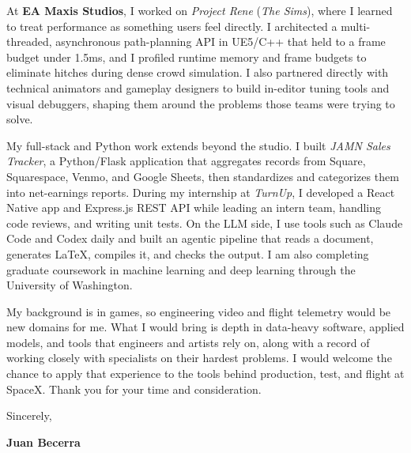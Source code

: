 \documentclass[letterpaper,11pt]{article}
\begin{document}
At \textbf{EA Maxis Studios}, I worked on \emph{Project Rene} (\emph{The Sims}), where I learned to treat
performance as something users feel directly. I architected a multi-threaded, asynchronous path-planning
API in UE5/C++ that held to a frame budget under 1.5ms, and I profiled runtime memory and frame budgets to
eliminate hitches during dense crowd simulation. I also partnered directly with technical animators and
gameplay designers to build in-editor tuning tools and visual debuggers, shaping them around the problems
those teams were trying to solve.

My full-stack and Python work extends beyond the studio. I built \emph{JAMN Sales Tracker}, a Python/Flask
application that aggregates records from Square, Squarespace, Venmo, and Google Sheets, then standardizes
and categorizes them into net-earnings reports. During my internship at \emph{TurnUp}, I developed a React
Native app and Express.js REST API while leading an intern team, handling code reviews, and writing unit
tests. On the LLM side, I use tools such as Claude Code and Codex daily and built an agentic pipeline that
reads a document, generates LaTeX, compiles it, and checks the output. I am also completing graduate
coursework in machine learning and deep learning through the University of Washington.

My background is in games, so engineering video and flight telemetry would be new domains for me. What I
would bring is depth in data-heavy software, applied models, and tools that engineers and artists rely on,
along with a record of working closely with specialists on their hardest problems. I would welcome the chance
to apply that experience to the tools behind production, test, and flight at SpaceX. Thank you for your
time and consideration.

\vspace{10pt}
\noindent Sincerely,

\vspace{14pt}
\noindent \textbf{Juan Becerra}
\end{document}
